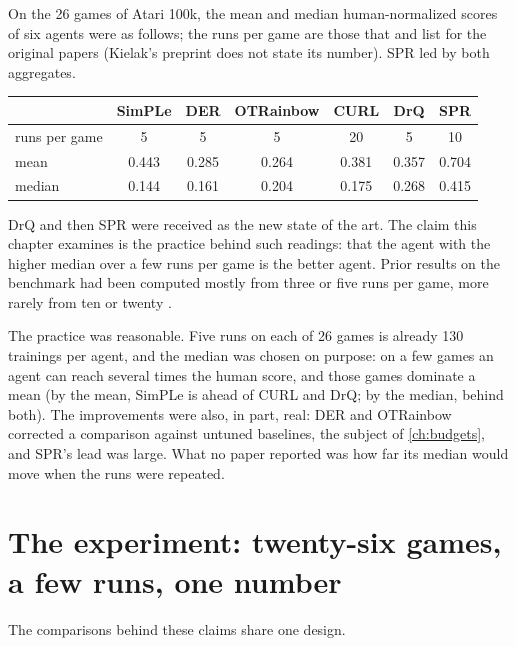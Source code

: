 \begin{refsection}
\begin{finding}\label{fd:aggregates:table}
On the 26 games of Atari 100k, the mean and median human-normalized scores of six agents were as follows; the runs per game are those that \textcite{SchwarzerEtAl2021} and \textcite{AgarwalEtAl2021} list for the original papers (Kielak's preprint does not state its number). SPR led by both aggregates.
\begin{center}\small
\begin{tabular}{lcccccc}
\toprule
 & SimPLe & DER & OTRainbow & CURL & DrQ & SPR\\
\midrule
runs per game & 5 & 5 & 5 & 20 & 5 & 10\\
mean & 0.443 & 0.285 & 0.264 & 0.381 & 0.357 & 0.704\\
median & 0.144 & 0.161 & 0.204 & 0.175 & 0.268 & 0.415\\
\bottomrule
\end{tabular}
\end{center}
\end{finding}

DrQ and then SPR were received as the new state of the art. The claim this chapter examines is the practice behind such readings: that the agent with the higher median over a few runs per game is the better agent. Prior results on the benchmark had been computed mostly from three or five runs per game, more rarely from ten or twenty \parencite{AgarwalEtAl2021}.

The practice was reasonable. Five runs on each of 26 games is already 130 trainings per agent, and the median was chosen on purpose: on a few games an agent can reach several times the human score, and those games dominate a mean (by the mean, SimPLe is ahead of CURL and DrQ; by the median, behind both). The improvements were also, in part, real: DER and OTRainbow corrected a comparison against untuned baselines, the subject of \cref{ch:budgets}, and SPR's lead was large. What no paper reported was how far its median would move when the runs were repeated.

\section{The experiment: twenty-six games, a few runs, one number}\label{sec:aggregates:experiment}

The comparisons behind these claims share one design.


\end{refsection}
